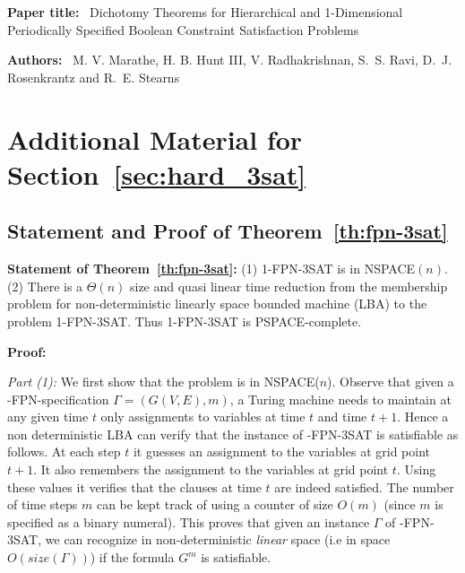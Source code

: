 
\appendix

\vspace*{2in}

\begin{center}
\end{center}

\bigskip\bigskip\bigskip


\noindent
\textbf{Paper title:}~ Dichotomy Theorems for Hierarchical and 1-Dimensional
Periodically Specified Boolean Constraint Satisfaction Problems

\bigskip

\noindent
\textbf{Authors:}~ M. V. Marathe, H. B. Hunt III, V. Radhakrishnan, S.~S. Ravi,
D.~J. Rosenkrantz and R.~E. Stearns

\clearpage

\section{Additional Material for Section~\ref{sec:hard_3sat}}
\label{sec:appA}

\subsection{Statement and Proof of Theorem~\ref{th:fpn-3sat}}

\noindent
\textbf{Statement of Theorem~\ref{th:fpn-3sat}:}
(1) 1-FPN-3SAT is in NSPACE$(n)$.~
(2) There is a $\Theta(n)$ size and
quasi linear time reduction from the membership problem
for  non-deterministic linearly space bounded machine (LBA) 
to the problem 1-FPN-3SAT. 
Thus 1-FPN-3SAT is {\sf PSPACE}-complete. 

\medskip

\noindent
{\bf Proof:}  

\noindent
{\em Part (1):}
We first show that the problem is in {\sf NSPACE($n$)}.
Observe that given a {-FPN}-specification 
$\Gamma = (G(V,E), m)$, a Turing machine 
needs to maintain at any given time $t$ 
only assignments to variables at time $t$ and time $t+1$. 
Hence a non deterministic {\sf LBA}
can verify that the instance of {-FPN-3SAT} is satisfiable as follows. At 
each step $t$ it guesses an assignment to the variables at grid point $t+1$.
It also remembers the assignment to the variables at grid point $t$. Using
these values it verifies that the clauses at time $t$ are indeed satisfied.
The number of time steps  $m$ can be kept track of using a counter of size
$O(m)$ (since $m$ is specified as a binary numeral). 
This proves that given an instance $\Gamma$ 
of {-FPN-3SAT}, we can recognize in 
non-deterministic {\em linear } space (i.e in space $O(size(\Gamma))$) 
if the formula $G^m$ is satisfiable.

